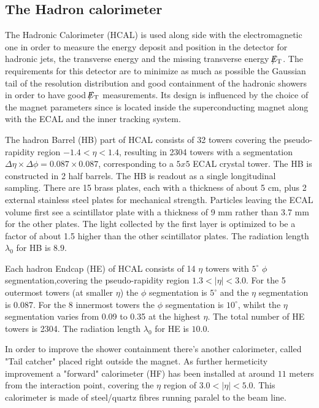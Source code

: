 \clearpage

\subsection{The Hadron calorimeter}

The Hadronic Calorimeter (HCAL) is used along side with the electromagnetic one in order to measure the energy deposit and position in the detector for hadronic jets, the transverse energy and the missing transverse energy $\slash\mkern-12mu{E}_{\text{T}}$. The requirements for this detector are to minimize as much as possible the Gaussian tail of the resolution distribution and good containment of the hadronic showers in order to have good $\slash\mkern-12mu{E}_{\text{T}}$ measurements. Its design is influenced by the choice of the magnet parameters since is located inside the superconducting magnet along with the ECAL and the inner tracking system. 

The hadron Barrel (HB) part of HCAL consists of 32 towers covering the pseudo-rapidity region $−1.4 < \eta < 1.4$, resulting in 2304 towers with a segmentation $\Delta\eta\times\Delta\phi = 0.087\times0.087$, corresponding to a $5x5$ ECAL crystal tower. The HB is constructed in 2 half barrels. The HB is readout as a single longitudinal sampling. There are 15 brass plates, each with a thickness of about 5 cm, plus 2 external stainless steel plates for mechanical strength. Particles leaving the ECAL volume ﬁrst see a scintillator plate with a thickness of 9 mm rather than 3.7 mm for the other plates. The light collected by the ﬁrst layer is optimized to be a factor of about 1.5 higher than the other scintillator plates. The radiation length $\lambda_{0}$ for HB is $8.9$.

Each hadron Endcap (HE) of HCAL consists of 14 $\eta$ towers with $5^{\circ}$ $\phi$ segmentation,covering the pseudo-rapidity region $1.3 < |\eta| < 3.0$. For the 5 outermost towers (at smaller $\eta$) the $\phi$ segmentation is $5^{\circ}$ and the $\eta$ segmentation is 0.087. For the 8 innermost towers the $\phi$ segmentation is $10^{\circ}$, whilst the $\eta$ segmentation varies from 0.09 to 0.35 at the highest $\eta$. The total number of HE towers is 2304. The radiation length $\lambda_{0}$ for HE is $10.0$.

In order to improve the shower containment there's another calorimeter, called "Tail catcher" placed right outside the magnet. As further hermeticity improvement a "forward" calorimeter (HF) has been installed at around $11$ meters from the interaction point, covering the $\eta$ region of $3.0 < |\eta| <5.0$. This calorimeter is made of steel/quartz fibres running paralel to the beam line.

